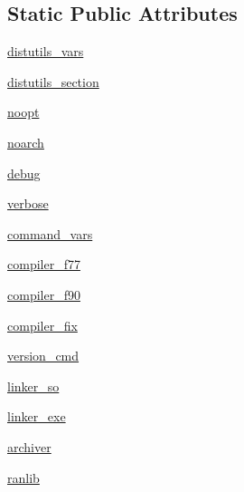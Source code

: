 \subsection*{Static Public Attributes}
\begin{DoxyCompactItemize}
\item 
\hyperlink{classnumpy_1_1distutils_1_1fcompiler_1_1FCompiler_aa09d0cb569f7f0bb45c1db919992059d}{distutils\+\_\+vars}
\item 
\hyperlink{classnumpy_1_1distutils_1_1fcompiler_1_1FCompiler_adc310aba82a2e49234f1ad62255698b7}{distutils\+\_\+section}
\item 
\hyperlink{classnumpy_1_1distutils_1_1fcompiler_1_1FCompiler_ad4d5ac827b3a5520b0f09f9f84c67150}{noopt}
\item 
\hyperlink{classnumpy_1_1distutils_1_1fcompiler_1_1FCompiler_a8a5fcc3d9c89f741f09b19712a47f62e}{noarch}
\item 
\hyperlink{classnumpy_1_1distutils_1_1fcompiler_1_1FCompiler_a7ca30a0f689d360050c93c6d277966c4}{debug}
\item 
\hyperlink{classnumpy_1_1distutils_1_1fcompiler_1_1FCompiler_a456aa8b7312ee1ce761ab7429653dabb}{verbose}
\item 
\hyperlink{classnumpy_1_1distutils_1_1fcompiler_1_1FCompiler_a144e77f277205dfd800c2ee17131d3e8}{command\+\_\+vars}
\item 
\hyperlink{classnumpy_1_1distutils_1_1fcompiler_1_1FCompiler_a02d1b18713850c057edb5515263f2fb6}{compiler\+\_\+f77}
\item 
\hyperlink{classnumpy_1_1distutils_1_1fcompiler_1_1FCompiler_a8bf6550134b82d3306a4759f890a0714}{compiler\+\_\+f90}
\item 
\hyperlink{classnumpy_1_1distutils_1_1fcompiler_1_1FCompiler_a35ad1105f02d45e8e99b63b9d545ea63}{compiler\+\_\+fix}
\item 
\hyperlink{classnumpy_1_1distutils_1_1fcompiler_1_1FCompiler_a9b0c3f41b719a31153d457b39b739206}{version\+\_\+cmd}
\item 
\hyperlink{classnumpy_1_1distutils_1_1fcompiler_1_1FCompiler_a8a3d9093158896776ed0a09d87c2d25a}{linker\+\_\+so}
\item 
\hyperlink{classnumpy_1_1distutils_1_1fcompiler_1_1FCompiler_a863e416e8db5149a9b9e1371fcddeb07}{linker\+\_\+exe}
\item 
\hyperlink{classnumpy_1_1distutils_1_1fcompiler_1_1FCompiler_a671573e45367ac7650341d37560edadb}{archiver}
\item 
\hyperlink{classnumpy_1_1distutils_1_1fcompiler_1_1FCompiler_a81c269b8e7a61e632238f5365a85dc98}{ranlib}

\end{DoxyCompactItemize}
